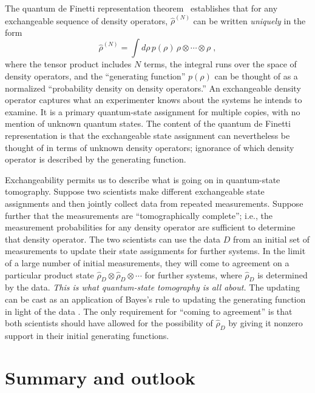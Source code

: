 \documentclass[aps,12pt]{revtex4}
\begin{document}
The quantum de Finetti representation theorem~\cite{Hudson76,Caves01}
establishes that for any exchangeable sequence of density operators,
$\hat\rho^{(N)}$ can be written {\it uniquely\/} in the form
\begin{equation}
\hat\rho^{(N)}=\int d\rho\,p(\rho)\,\rho\otimes\cdots\otimes\rho\;,
\end{equation}
where the tensor product includes $N$ terms, the integral runs over
the space of density operators, and the ``generating function''
$p(\rho)$ can be thought of as a normalized ``probability density on
density operators.''  An exchangeable density operator captures what
an experimenter knows about the systems he intends to examine.  It is
a primary quantum-state assignment for multiple copies, with no
mention of unknown quantum states.  The content of the quantum de
Finetti representation is that the exchangeable state assignment can
nevertheless be thought of in terms of unknown density operators;
ignorance of which density operator is described by the generating
function.

Exchangeability permits us to describe what is going on in
quantum-state tomography.  Suppose two scientists make different
exchangeable state assignments and then jointly collect data from
repeated measurements.  Suppose further that the measurements are
``tomographically complete''; i.e., the measurement probabilities for
any density operator are sufficient to determine that density
operator.  The two scientists can use the data $D$ from an initial
set of measurements to update their state assignments for further
systems.  In the limit of a large number of initial measurements,
they will come to agreement on a particular product state
$\hat\rho_{\scriptscriptstyle D}\otimes\hat\rho_{\scriptscriptstyle
D}\otimes\cdots$ for further systems, where
$\hat\rho_{\scriptscriptstyle D}$ is determined by the data. {\it
This is what quantum-state tomography is all about.}  The updating
can be cast as an application of Bayes's rule to updating the
generating function in light of the data \cite{Schack01}.  The only
requirement for ``coming to agreement'' is that both scientists
should have allowed for the possibility of
$\hat\rho_{\scriptscriptstyle D}$ by giving it nonzero support in
their initial generating functions.

\section{Summary and outlook}
\end{document}
